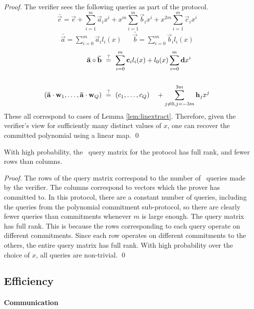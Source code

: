 \begin{proof}
The verifier sees the following queries as part of the protocol.
\[
\bar{\vec{e}} = \vec{e} + \sum_{i=1}^m \vec{a}_{i} x^i + x^m \sum_{i=1}^m \vec{b}_{i} x^i + x^{2m} \sum_{i=1}^m \vec{c}_{i} x^i
\]
\begin{align*}
\bar{\vec{a}} = \sum_{i=0}^m \vec{a}_{i} l_i(x) && \bar{\vec{b}} = \sum_{i=0}^m \vec{b}_{i} l_i(x)
\end{align*}
\begin{align*}
\mathbf{\bar{a}} \circ \mathbf{\bar{b}} ~&\overset{?}{=}~ \sum_{i=0}^m \mathbf{c}_{i} l_i(x) + l_0(x) \sum_{i=0}^m \mathbf{d} x^i \\ \\
\left(\mathbf{\bar{a}}\cdot \mathbf{w}_1,\ldots,\mathbf{\bar{a}}\cdot \mathbf{w}_Q \right) ~&\overset{?}{=}~ (c_1,\ldots,c_Q) \quad + \sum_{j\neq 0,j=-3m}^{3m} \mathbf{h}_j {x^j}
\end{align*}
These all correspond to cases of Lemma \ref{lem:linextract}. Therefore, given the verifier's view for sufficiently many distinct values of $x$, one can recover the committed polynomial using a linear map. \qed
\end{proof}

\begin{lemma}
With high probability, the \ILC\ query matrix for the protocol has full rank, and fewer rows than columns.
\end{lemma}

\begin{proof}
The rows of the query matrix correspond to the number of \ILC\ queries made by the verifier. The columns correspond to vectors which the prover has committed to. In this protocol, there are a constant number of queries, including the queries from the polynomial commitment sub-protocol, so there are clearly fewer queries than commitments whenever $m$ is large enough. The query matrix has full rank. This is because the rows corresponding to each query operate on different commitments. Since each row operates on different commitments to the others, the entire query matrix has full rank. With high probability over the choice of $x$, all queries are non-trivial. \qed
\end{proof}

\subsection{Efficiency}

\paragraph{Communication}

